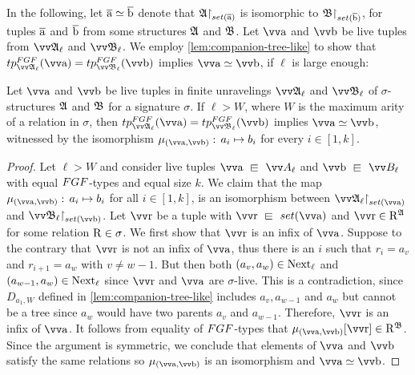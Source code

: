 In the following, let $\overline{\mathrm{a}} \simeq \overline{\mathrm{b}}$ denote that $\restr{\str{A}}{\set(\elemtuplea)}$ is isomorphic to $\restr{\str{B}}{\set(\elemtupleb)}$, for tuples $\overline{\mathrm{a}}$ and $\overline{\mathrm{b}}$ from some structures ${\mathfrak{A}}$ and ${\mathfrak{B}}$.
Let $\elemtuptuplea$ and $\elemtuptupleb$ be live tuples from $\unravel{A}_{\ell}$ and $\unravel{B}_{\ell}$.
We employ \cref{lem:companion-tree-like} to show that $\tp{\FGF}{\unravel{A}_{\ell}}{\elemtuptuplea} = \tp{\FGF}{\unravel{B}_{\ell}}{\elemtuptupleb}$ implies $\elemtuptuplea \simeq \elemtuptupleb$, if $\ell$ is large enough:
\begin{lemma}\label{lem:fgf-type-iso}
  Let $\elemtuptuplea$ and $\elemtuptupleb$ be live tuples in finite unravelings $\unravel{A}_{\ell}$ and $\unravel{B}_{\ell}$ of $\sigma$-structures ${\mathfrak{A}}$ and ${\mathfrak{B}}$ for a signature $\sigma$.
  If $\ell > W$, where $W$ is the maximum arity of a relation in $\sigma$, then $\tp{\FGF}{\unravel{A}_{\ell}}{\elemtuptuplea} = \tp{\FGF}{\unravel{B}_{\ell}}{\elemtuptupleb}$ implies $\elemtuptuplea \simeq \elemtuptupleb$, witnessed by the isomorphism $\mu_{(\elemtuptuplea, \elemtuptupleb)}:\, a_{i} \mapsto b_{i}$ for every $i \in [1, k]$.
\end{lemma}
\begin{proof}
Let $\ell > W$ and consider live tuples $\elemtuptuplea \sqin \unraveldom{A}_{\ell}$ and $\elemtuptupleb \sqin \unraveldom{B}_{\ell}$ with equal $\FGF$-types and equal size $k$.
We claim that the map $\mu_{(\elemtuptuplea, \elemtuptupleb)}:\, a_{i} \mapsto b_{i}$ for all $i \in [1, k]$, is an isomorphism between $\restr{\str{\unravel{A}_{\ell}}}{\set(\elemtuptuplea)}$ and $\restr{\str{\unravel{B}_{\ell}}}{\set(\elemtuptupleb)}$.
Let $\elemtuptupler$ be a tuple with $\elemtuptupler \sqin \set(\elemtuptuplea)$ and $\elemtuptupler \in \relR^{\str{A}}$ for some relation $\mathrm{R} \in \sigma$.
We first show that $\elemtuptupler$ is an infix of $\elemtuptuplea$.
Suppose to the contrary that $\elemtuptupler$ is not an infix of $\elemtuptuplea$, thus there is an $i$ such that $r_{i} = a_{v}$ and $r_{i+1} = a_{w}$ with $v \ne w - 1$.
But then both $(a_{v}, a_{w}) \in \mathrm{Next}_{\ell}$ and $(a_{w-1}, a_{w}) \in \mathrm{Next}_{\ell}$ since $\elemtuptupler$ and $\elemtuptuplea$ are $\sigma$-live.
This is a contradiction, since $D_{a_{1}, W}$ defined in \cref{lem:companion-tree-like} includes $a_{v}, a_{w-1}$ and $a_{w}$ but cannot be a tree since $a_{w}$ would have two parents $a_{v}$ and $a_{w-1}$.
Therefore, $\elemtuptupler$ is an infix of $\elemtuptuplea$.
It follows from equality of $\FGF$-types that $\mu_{(\elemtuptuplea, \elemtuptupleb)}[\elemtuptupler] \in \relR^{\str{B}}$.
Since the argument is symmetric, we conclude that elements of $\elemtuptuplea$ and $\elemtuptupleb$ satisfy the same relations so $\mu_{(\elemtuptuplea, \elemtuptupleb)}$ is an isomorphism and $\elemtuptuplea \simeq \elemtuptupleb$.
\end{proof}

